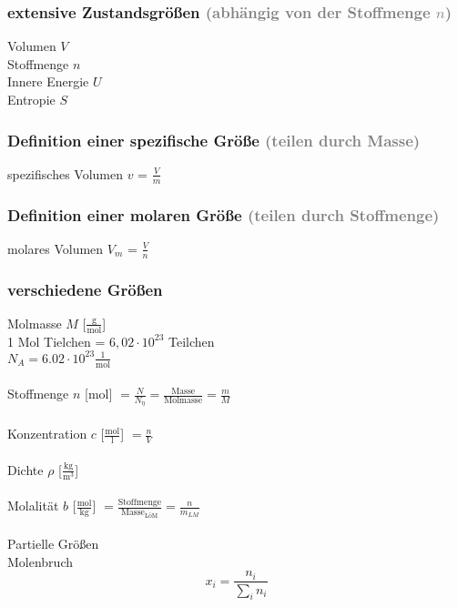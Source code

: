 \documentclass[a4paper, fleqn]{article}
\begin{document}
\subsubsection{extensive Zustandsgrößen \textcolor{gray}{(abhängig von der Stoffmenge $n$)}}
Volumen $V$\\
Stoffmenge $n$\\
Innere Energie $U$\\
Entropie $S$\\
\subsubsection{Definition einer spezifische Größe \textcolor{gray}{(teilen durch Masse)}}
spezifisches Volumen $v$ = $\frac{V}{m}$
\subsubsection{Definition einer molaren Größe \textcolor{gray}{(teilen durch Stoffmenge)}}
molares Volumen $V_m$ = $\frac{V}{n}$
\subsubsection{verschiedene Größen}
Molmasse $M$ [$\frac{\mathrm{g}}{\mathrm{mol}}$]\\
1 Mol Tielchen = $6, 02 \cdot 10^{23}$ Teilchen\\
$N_A = 6.02 \cdot 10^{23} \frac{1}{\mathrm{mol}}$\\\\
Stoffmenge $n$ [mol] $=\frac{N}{N_\eta}=\frac{\mathrm{Masse}}{\mathrm{Molmasse}}=\frac{m}{M}$\\\\
Konzentration $c$ [$\frac{\mathrm{mol}}{\mathrm{l}}$] $= \frac{n}{V}$\\\\
Dichte $\rho$ [$\frac{\mathrm{kg}}{\mathrm{m}^3}$]\\\\
Molalität $b$ [$\frac{\mathrm{mol}}{\mathrm{kg}}$] $=\frac{\mathrm{Stoffmenge}}{\mathrm{Masse_{L\text{ö}M}}}=\frac{n}{m_{LM}}$\\\\
Partielle Größen\\
Molenbruch\\
\begin{equation*}
    x_i=\frac{n_i}{\sum_i n_i}
\end{equation*}
\end{document}
